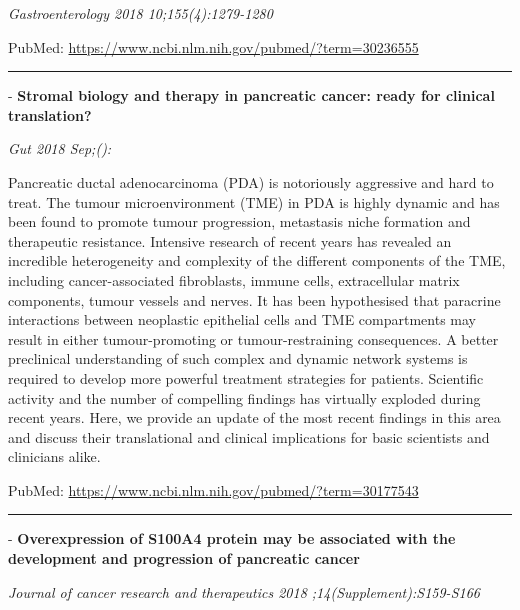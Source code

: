 \documentclass[]{article}
\begin{document}
\emph{Gastroenterology 2018 10;155(4):1279-1280}

PubMed: \url{https://www.ncbi.nlm.nih.gov/pubmed/?term=30236555}

{}

{}

\begin{center}\rule{0.5\linewidth}{\linethickness}\end{center}

 - \textbf{Stromal biology and therapy in pancreatic cancer: ready for
clinical translation?}

\emph{Gut 2018 Sep;():}

Pancreatic ductal adenocarcinoma (PDA) is notoriously aggressive and
hard to treat. The tumour microenvironment (TME) in PDA is highly
dynamic and has been found to promote tumour progression, metastasis
niche formation and therapeutic resistance. Intensive research of recent
years has revealed an incredible heterogeneity and complexity of the
different components of the TME, including cancer-associated
fibroblasts, immune cells, extracellular matrix components, tumour
vessels and nerves. It has been hypothesised that paracrine interactions
between neoplastic epithelial cells and TME compartments may result in
either tumour-promoting or tumour-restraining consequences. A better
preclinical understanding of such complex and dynamic network systems is
required to develop more powerful treatment strategies for patients.
Scientific activity and the number of compelling findings has virtually
exploded during recent years. Here, we provide an update of the most
recent findings in this area and discuss their translational and
clinical implications for basic scientists and clinicians alike.

PubMed: \url{https://www.ncbi.nlm.nih.gov/pubmed/?term=30177543}

{}

{}

\begin{center}\rule{0.5\linewidth}{\linethickness}\end{center}

 - \textbf{Overexpression of S100A4 protein may be associated with the
development and progression of pancreatic cancer}

\emph{Journal of cancer research and therapeutics 2018
;14(Supplement):S159-S166}
\end{document}
